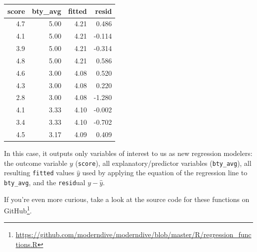 \documentclass[12pt,]{krantz}
\makeatletter
\newenvironment{Shaded}{\begin{snugshade}}{\end{snugshade}}
\newcommand{\KeywordTok}[1]{\textcolor[rgb]{0.27,0.27,0.27}{\textbf{#1}}}
\newcommand{\DataTypeTok}[1]{\textcolor[rgb]{0.27,0.27,0.27}{#1}}
\newcommand{\DecValTok}[1]{\textcolor[rgb]{0.06,0.06,0.06}{#1}}
\newcommand{\StringTok}[1]{\textcolor[rgb]{0.5,0.5,0.5}{#1}}
\newcommand{\OperatorTok}[1]{\textcolor[rgb]{0.43,0.43,0.43}{\textbf{#1}}}
\newcommand{\NormalTok}[1]{#1}
\renewcommand{\href}[2]{#2\footnote{\url{#1}}}
\newenvironment{kframe}{%
\medskip{}
\setlength{\fboxsep}{.8em}
 \def\at@end@of@kframe{}%
 \ifinner\ifhmode%
  \def\at@end@of@kframe{\end{minipage}}%
  \begin{minipage}{\columnwidth}%
 \fi\fi%
 \def\FrameCommand##1{\hskip\@totalleftmargin \hskip-\fboxsep
 \colorbox{shadecolor}{##1}\hskip-\fboxsep
     \hskip-\linewidth \hskip-\@totalleftmargin \hskip\columnwidth}%
 \MakeFramed {\advance\hsize-\width
   \@totalleftmargin\z@ \linewidth\hsize
   \@setminipage}}%
 {\par\unskip\endMakeFramed%
 \at@end@of@kframe}
\renewenvironment{Shaded}{\begin{kframe}}{\end{kframe}}
\theoremstyle{definition}
\theoremstyle{definition}
\theoremstyle{definition}
\theoremstyle{remark}
\makeatother
\begin{document}
\begin{Shaded}
\end{Shaded}

\begin{table}[H]
\centering\begingroup\fontsize{10}{12}\selectfont

\begin{tabular}{r|r|r|r}
\hline
score & bty\_avg & fitted & resid\\
\hline
4.7 & 5.00 & 4.21 & 0.486\\
\hline
4.1 & 5.00 & 4.21 & -0.114\\
\hline
3.9 & 5.00 & 4.21 & -0.314\\
\hline
4.8 & 5.00 & 4.21 & 0.586\\
\hline
4.6 & 3.00 & 4.08 & 0.520\\
\hline
4.3 & 3.00 & 4.08 & 0.220\\
\hline
2.8 & 3.00 & 4.08 & -1.280\\
\hline
4.1 & 3.33 & 4.10 & -0.002\\
\hline
3.4 & 3.33 & 4.10 & -0.702\\
\hline
4.5 & 3.17 & 4.09 & 0.409\\
\hline
\end{tabular}\endgroup{}
\end{table}

In this case, it outputs only variables of interest to us as new
regression modelers: the outcome variable \(y\) (\texttt{score}), all
explanatory/predictor variables (\texttt{bty\_avg}), all resulting
\texttt{fitted} values \(\hat{y}\) used by applying the equation of the
regression line to \texttt{bty\_avg}, and the \texttt{resid}ual
\(y - \hat{y}\).

If you're even more curious, take a look at the source code for these
functions on
\href{https://github.com/moderndive/moderndive/blob/master/R/regression_functions.R}{GitHub}.
\end{document}

